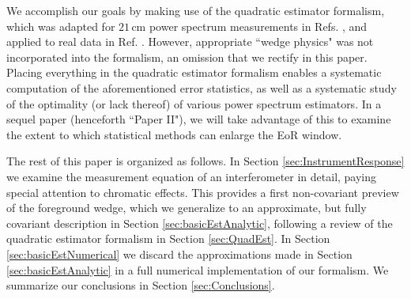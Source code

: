 \documentclass[twocolumn,aps,prd,nofootinbib,showpacs]{revtex4-1}
\begin{document}
We accomplish our goals by making use of the quadratic estimator formalism, which was adapted for $21\,\textrm{cm}$ power spectrum measurements in Refs. \cite{Liu2011,Dillon2013}, and applied to real data in Ref. \cite{Dillon2014}.  However, appropriate ``wedge physics" was not incorporated into the formalism, an omission that we rectify in this paper.  Placing everything in the quadratic estimator formalism enables a systematic computation of the aforementioned error statistics, as well as a systematic study of the optimality (or lack thereof) of various power spectrum estimators.  In a sequel paper (henceforth ``Paper II"), we will take advantage of this to examine the extent to which statistical methods can enlarge the EoR window.

The rest of this paper is organized as follows.  In Section \ref{sec:InstrumentResponse} we examine the measurement equation of an interferometer in detail, paying special attention to chromatic effects.  This provides a first non-covariant preview of the foreground wedge, which we generalize to an approximate, but fully covariant description in Section \ref{sec:basicEstAnalytic}, following a review of the quadratic estimator formalism in Section \ref{sec:QuadEst}.  In Section \ref{sec:basicEstNumerical} we discard the approximations made in Section \ref{sec:basicEstAnalytic} in a full numerical implementation of our formalism.  We summarize our conclusions in Section \ref{sec:Conclusions}.
\end{document}
